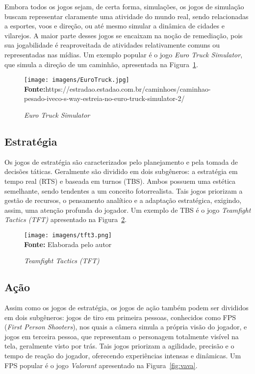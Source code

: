 Embora todos os jogos sejam, de certa forma, simulações, os jogos de simulação buscam representar claramente uma atividade do mundo real, sendo relacionadas a esportes, voos e direção, ou até mesmo simular a dinâmica de cidades e vilarejos. A maior parte desses jogos se encaixam na noção de remediação, pois sua jogabilidade é reaproveitada de atividades relativamente comuns ou representadas nas mídias. Um exemplo popular é o jogo \textit{Euro Truck Simulator}, que simula a direção de um caminhão, apresentada na Figura~\ref{fig:simulacao}.


\FloatBarrier 
\begin{figure}[!htbp]
	\centering
	\caption{\textit{Euro Truck Simulator}}
	\texttt{[image: imagens/EuroTruck.jpg]}
	\\\textbf{Fonte:}https://estradao.estadao.com.br/caminhoes/caminhao-pesado-iveco-s-way-estreia-no-euro-truck-simulator-2/ 
	
	\label{fig:simulacao}
\end{figure}
\FloatBarrier


\subsection{Estratégia}

Os jogos de estratégia são caracterizados pelo planejamento e pela tomada de decisões táticas. Geralmente são dividido em dois subgêneros: a estratégia em tempo real (RTS) e baseada em turnos (TBS). Ambos possuem uma estética semelhante, sendo tendentes a um conceito fotorrealista. Tais jogos priorizam a gestão de recursos, o pensamento analítico e a adaptação estratégica, exigindo, assim, uma atenção profunda do jogador. Um exemplo de TBS é o jogo \textit{Teamfight Tactics (TFT)} apresentado na Figura~\ref{fig:tactics}.

\FloatBarrier 
\begin{figure}[!htbp]
	\centering
	\caption{\textit{Teamfight Tactics (TFT)}}
	\texttt{[image: imagens/tft3.png]}
	\\\textbf{Fonte:} Elaborada pelo autor
	
	\label{fig:tactics}
\end{figure}
\FloatBarrier


\subsection{Ação}

Assim como os jogos de estratégia, os jogos de ação também podem ser divididos em dois subgêneros: jogos de tiro em primeira pessoas, conhecidos como FPS (\textit{First Person Shooters}), nos quais a câmera simula a própria visão do jogador, e jogos em terceira pessoa, que representam o personagem totalmente visível na tela, geralmente visto por trás. Tais jogos priorizam a agilidade, precisão e o tempo de reação do jogador, oferecendo experiências intensas e dinâmicas. Um FPS popular é o jogo \textit{Valorant} apresentado na   Figura~\ref{fig:vava}.


